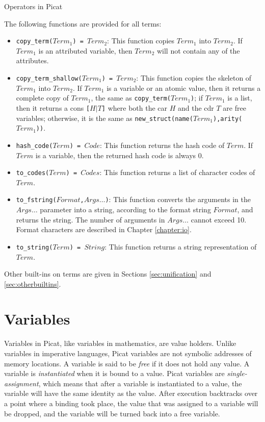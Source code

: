 \begin{table}
\caption{\label{tab:ops}Operators in Picat}

\end{table}

The following functions are provided for all terms:
\begin{itemize}
\item \texttt{copy\_term($Term_1$) = $Term_2$}: This function copies $Term_1$ into $Term_2$.  If $Term_1$ is an attributed variable, then $Term_2$ will not contain any of the attributes.
\item \texttt{copy\_term\_shallow($Term_1$) = $Term_2$}: This function copies the skeleton of $Term_1$ into $Term_2$. If $Term_1$ is a variable or an atomic value, then it returns a complete copy of $Term_1$, the same as \texttt{copy\_term($Term_1$)}; if $Term_1$ is a list, then it returns a cons \texttt{[$H$$|$$T$]} where both the car $H$ and the cdr $T$ are free variables; otherwise, it is the same as \texttt{new\_struct(name($Term_1$),arity($Term_1$))}.
\item \texttt{hash\_code($Term$) = $Code$}: This function returns the hash code of $Term$. If $Term$ is a variable, then the returned hash code is always 0.
\item \texttt{to\_codes($Term$) = $Codes$}: This function returns a list of character codes of $Term$.
\item \texttt{to\_fstring($Format$,$Args\ldots$)}: This function converts the arguments in the $Args\ldots$ parameter into a string, according to the format string $Format$, and returns the string. The number of arguments in $Args\ldots$ cannot exceed 10. Format characters are described in Chapter \ref{chapter:io}.
\item \texttt{to\_string($Term$) = $String$}: This function returns a string representation of $Term$.
\end{itemize}
Other built-ins on terms are given in Sections \ref{sec:unification} and \ref{sec:otherbuiltins}.

\section{Variables}
Variables in Picat, like variables in mathematics, are value holders. Unlike variables in imperative languages, Picat variables are not symbolic addresses of memory locations. A variable is said to be \emph{free} if it does not hold any value. A variable is \emph{instantiated} when it is bound to a value. Picat variables are \emph{single-assignment}, which means that after a variable is instantiated to a value, the variable will have the same identity as the value. After execution backtracks over a point where a binding took place, the value that was assigned to a variable will be dropped, and the variable will be turned back into a free variable.

